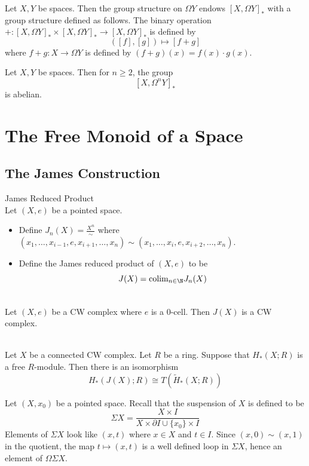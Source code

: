 \documentclass[a4paper]{article}
\begin{document}
\begin{prp}{}{} Let $X,Y$ be spaces. Then the group structure on $\Omega Y$ endows $[X,\Omega Y]_\ast$ with a group structure defined as follows. The binary operation $+:[X,\Omega Y]_\ast\times[X,\Omega Y]_\ast\to[X,\Omega Y]_\ast$ is defined by $$([f],[g])\mapsto[f+g]$$ where $f+g:X\to\Omega Y$ is defined by $(f+g)(x)=f(x)\cdot g(x)$. 
\end{prp}

\begin{prp}{}{} Let $X,Y$ be spaces. Then for $n\geq 2$, the group $$[X,\Omega^n Y]_\ast$$ is abelian. 
\end{prp}

\pagebreak
\section{The Free Monoid of a Space}
\subsection{The James Construction}
\begin{defn}{James Reduced Product}{}\\
Let $(X,e)$ be a pointed space. 
\begin{itemize}
\item Define $J_n(X)=\frac{X^n}{\sim}$ where $(x_1,\dots,x_{i-1},e,x_{i+1},\dots,x_n)\sim(x_1,\dots,x_i,e,x_{i+2},\dots,x_n)$. 
\item Define the James reduced product of $(X,e)$ to be $$J(X)=\text{colim}_{n\in\N}J_n(X)$$
\end{itemize}
\end{defn}

\begin{lmm}{}{}\\
Let $(X,e)$ be a CW complex where $e$ is a $0$-cell. Then $J(X)$ is a CW complex. 
\end{lmm}

\begin{prp}{}{}\\
Let $X$ be a connected CW complex. Let $R$ be a ring. Suppose that $H_\ast(X;R)$ is a free $R$-module. Then there is an isomorphism $$H_\ast(J(X);R)\cong T(\widetilde{H}_\ast(X;R))$$
\end{prp}

Let $(X,x_0)$ be a pointed space. Recall that the suspension of $X$ is defined to be $$\Sigma X=\frac{X\times I}{X\times\partial I\cup\{x_0\}\times I}$$ Elements of $\Sigma X$ look like $(x,t)$ where $x\in X$ and $t\in I$. Since $(x,0)\sim(x,1)$ in the quotient, the map $t\mapsto(x,t)$ is a well defined loop in $\Sigma X$, hence an element of $\Omega\Sigma X$. 
\end{document}
